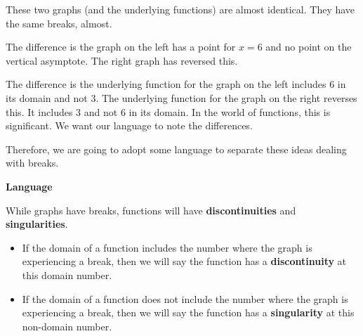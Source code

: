 \documentclass{ximera}
\begin{document}
\begin{image}
\end{image}


These two graphs (and the underlying functions) are almost identical. They have the same breaks, almost. 

The difference is the graph on the left has a point for $x=6$ and no point on the vertical asymptote.  The right graph has reversed this.

The difference is the underlying function for the graph on the left includes $6$ in its domain and not $3$. The underlying function for the graph on the right reverses this. It includes $3$ and not $6$ in its domain. In the world of functions, this is significant.  We want our language to note the differences. 

Therefore, we are going to adopt some language to separate these ideas dealing with breaks.


\begin{idea} \textbf{\textcolor{blue!55!black}{Language}}  


While graphs have breaks, functions will have \textbf{\textcolor{blue!55!black}{discontinuities}} and \textbf{\textcolor{blue!55!black}{singularities}}.

\begin{itemize}
\item If the domain of a function includes the number where the graph is experiencing a break, then we will say the function has a \textbf{\textcolor{blue!55!black}{discontinuity}} at this domain number.  

\item If the domain of a function does not include the number where the graph is experiencing a break, then we will say the function has a \textbf{\textcolor{blue!55!black}{singularity}} at this non-domain number.
\end{itemize}

\end{idea}
\end{document}
